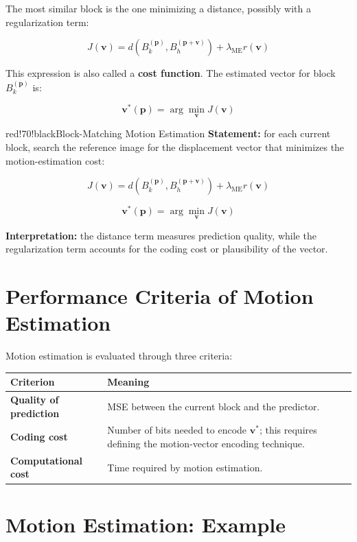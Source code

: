 The most similar block is the one minimizing a distance, possibly with a regularization term:

\[
J(\mathbf{v}) =
d\left(B_k^{(\mathbf{p})}, B_h^{(\mathbf{p}+\mathbf{v})}\right)
+ \lambda_{\text{ME}} r(\mathbf{v})
\]

This expression is also called a \textbf{cost function}. The estimated vector for block $B_k^{(\mathbf{p})}$ is:

\[
\mathbf{v}^*(\mathbf{p}) = \arg \min_{\mathbf{v}} J(\mathbf{v})
\]

\begin{calloutbox}{red!70!black}{Block-Matching Motion Estimation}
\textbf{Statement:} for each current block, search the reference image for the displacement vector that minimizes the motion-estimation cost:

\[
J(\mathbf{v}) =
d\left(B_k^{(\mathbf{p})}, B_h^{(\mathbf{p}+\mathbf{v})}\right)
+ \lambda_{\text{ME}} r(\mathbf{v})
\]

\[
\mathbf{v}^*(\mathbf{p}) = \arg \min_{\mathbf{v}} J(\mathbf{v})
\]

\textbf{Interpretation:} the distance term measures prediction quality, while the regularization term accounts for the coding cost or plausibility of the vector.
\end{calloutbox}

\section{Performance Criteria of Motion Estimation}

Motion estimation is evaluated through three criteria:

\begin{center}
\begin{tabular}{|l|l|}
\hline
\textbf{Criterion} & \textbf{Meaning} \\ \hline
\textbf{Quality of prediction} & MSE between the current block and the predictor. \\ \hline
\textbf{Coding cost} & Number of bits needed to encode $\mathbf{v}^*$; this requires defining the motion-vector encoding technique. \\ \hline
\textbf{Computational cost} & Time required by motion estimation. \\ \hline
\end{tabular}
\end{center}

\section{Motion Estimation: Example}


